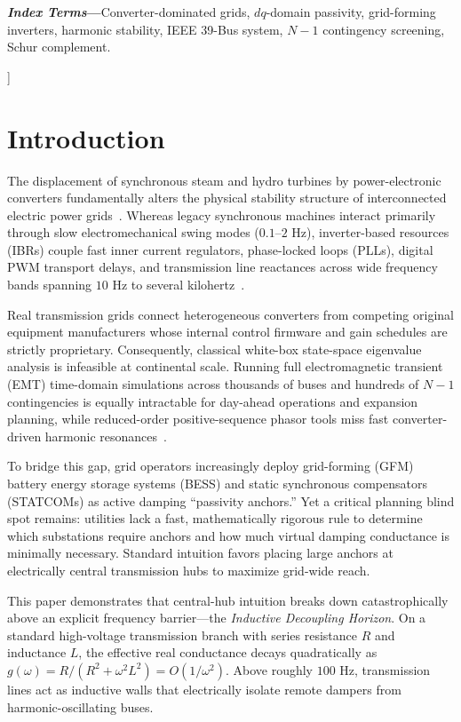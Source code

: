 \documentclass[10pt,twocolumn]{article}
\begin{document}
{{\begin{minipage}{\dimexpr\textwidth-2\fboxsep-2\fboxrule\relax}
\vspace{4pt}
\noindent\textbf{\textit{Index Terms}---}Converter-dominated grids, $dq$-domain passivity, grid-forming inverters, harmonic stability, IEEE 39-Bus system, $N-1$ contingency screening, Schur complement.
\end{minipage}%
}
\vspace{10pt}
}]

\section{Introduction}
The displacement of synchronous steam and hydro turbines by power-electronic converters fundamentally alters the physical stability structure of interconnected electric power grids~\cite{milano2018foundations}. Whereas legacy synchronous machines interact primarily through slow electromechanical swing modes ($0.1$--$2\text{ Hz}$), inverter-based resources (IBRs) couple fast inner current regulators, phase-locked loops (PLLs), digital PWM transport delays, and transmission line reactances across wide frequency bands spanning $10\text{ Hz}$ to several kilohertz~\cite{wang2018harmonic}.

Real transmission grids connect heterogeneous converters from competing original equipment manufacturers whose internal control firmware and gain schedules are strictly proprietary. Consequently, classical white-box state-space eigenvalue analysis is infeasible at continental scale. Running full electromagnetic transient (EMT) time-domain simulations across thousands of buses and hundreds of $N-1$ contingencies is equally intractable for day-ahead operations and expansion planning, while reduced-order positive-sequence phasor tools miss fast converter-driven harmonic resonances~\cite{wang2018harmonic,harnefors2016passivity}.

To bridge this gap, grid operators increasingly deploy grid-forming (GFM) battery energy storage systems (BESS) and static synchronous compensators (STATCOMs) as active damping ``passivity anchors.'' Yet a critical planning blind spot remains: utilities lack a fast, mathematically rigorous rule to determine which substations require anchors and how much virtual damping conductance is minimally necessary. Standard intuition favors placing large anchors at electrically central transmission hubs to maximize grid-wide reach.

This paper demonstrates that central-hub intuition breaks down catastrophically above an explicit frequency barrier---the \textit{Inductive Decoupling Horizon}. On a standard high-voltage transmission branch with series resistance $R$ and inductance $L$, the effective real conductance decays quadratically as $g(\omega)=R/(R^2+\omega^2 L^2)=O(1/\omega^2)$. Above roughly $100\text{ Hz}$, transmission lines act as inductive walls that electrically isolate remote dampers from harmonic-oscillating buses.
\end{document}
